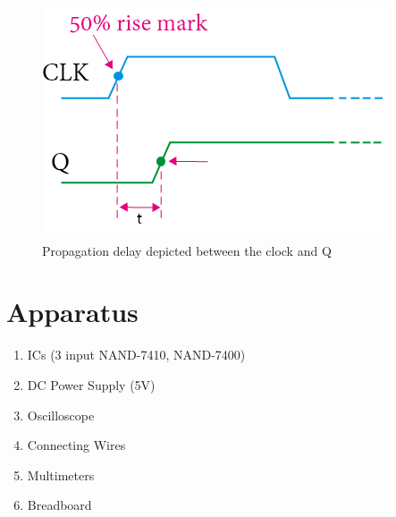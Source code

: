 \begin{figure}[H]
    \centering
    \includegraphics[width=0.7\columnwidth]{images/prop.png}
    \caption{Propagation delay depicted between the clock and Q}
\end{figure}

\section{Apparatus}

\begin{enumerate}
    \item ICs (3 input NAND-7410, NAND-7400)
    \item DC Power Supply (5V)
    \item Oscilloscope
    \item Connecting Wires
    \item Multimeters
    \item Breadboard
\end{enumerate}